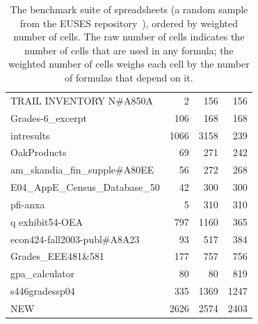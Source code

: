 \begin{table}[t!]
\begin{tabular}{l|rrr}
\small{TRAIL INVENTORY N\#A850A} & \small{2} & \small{156} & \small{156} \\ 
\small{Grades-6\_excerpt} & \small{106} & \small{168} & \small{168} \\ 
\small{intresults} & \small{1066} & \small{3158} & \small{239} \\ 
\small{OakProducts} & \small{69} & \small{271} & \small{242} \\ 
\small{am\_skandia\_fin\_supple\#A80EE} & \small{56} & \small{272} & \small{268} \\ 
\small{E04\_AppE\_Census\_Database\_50} & \small{42} & \small{300} & \small{300} \\ 
\small{pfi-anxa} & \small{5} & \small{310} & \small{310} \\ 
\small{q exhibit54-OEA} & \small{797} & \small{1160} & \small{365} \\ 
\small{econ424-fall2003-publ\#A8A23} & \small{93} & \small{517} & \small{384} \\ 
\small{Grades\_EEE481\&581} & \small{177} & \small{757} & \small{756} \\ 
\small{gpa\_calculator} & \small{80} & \small{80} & \small{819} \\ 
\small{s446gradessp04} & \small{335} & \small{1369} & \small{1247} \\ 
\small{NEW} & \small{2626} & \small{2574} & \small{2403} \\ 
    \hline
    \end{tabular}%
  \caption{The benchmark suite of spreadsheets (a random sample from the EUSES repository~\cite{Fisher:2005:ESC:1082983.1083242}), ordered by weighted number of cells. The raw number of cells indicates the number of cells that are used in any formula; the weighted number of cells weighs each cell by the number of formulas that depend on it.\label{tab:spreadsheet_characteristics}}
\end{table}
